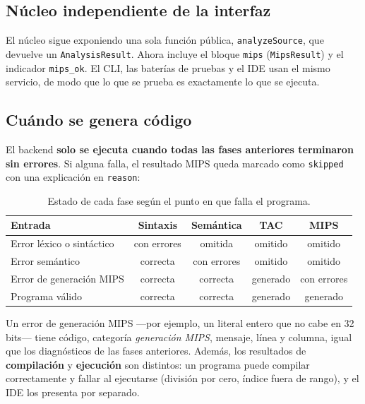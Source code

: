 \documentclass[11pt,a4paper]{article}
\begin{document}
\subsection{Núcleo independiente de la interfaz}

El núcleo sigue exponiendo una sola función pública, \texttt{analyzeSource}, que
devuelve un \texttt{AnalysisResult}. Ahora incluye el bloque \texttt{mips}
(\texttt{MipsResult}) y el indicador \texttt{mips\_ok}. El CLI, las baterías de
pruebas y el IDE usan el mismo servicio, de modo que lo que se prueba es
exactamente lo que se ejecuta.

\subsection{Cuándo se genera código}

El backend \textbf{solo se ejecuta cuando todas las fases anteriores terminaron
sin errores}. Si alguna falla, el resultado MIPS queda marcado como
\texttt{skipped} con una explicación en \texttt{reason}:

\begin{table}[H]
\centering
\small
\begin{tabular}{@{}L{4.3cm}cccc@{}}
\toprule
\textbf{Entrada} & \textbf{Sintaxis} & \textbf{Semántica} & \textbf{TAC} & \textbf{MIPS} \\
\midrule
Error léxico o sintáctico & con errores & omitida & omitido & omitido \\
Error semántico & correcta & con errores & omitido & omitido \\
Error de generación MIPS & correcta & correcta & generado & con errores \\
Programa válido & correcta & correcta & generado & generado \\
\bottomrule
\end{tabular}
\caption{Estado de cada fase según el punto en que falla el programa.}
\end{table}

Un error de generación MIPS ---por ejemplo, un literal entero que no cabe en 32
bits--- tiene código, categoría \emph{generación MIPS}, mensaje, línea y
columna, igual que los diagnósticos de las fases anteriores. Además, los
resultados de \textbf{compilación} y \textbf{ejecución} son distintos: un
programa puede compilar correctamente y fallar al ejecutarse (división por cero,
índice fuera de rango), y el IDE los presenta por separado.

\end{document}
